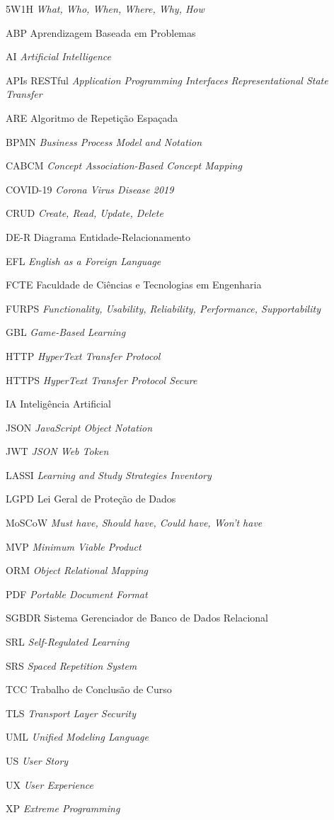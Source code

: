 \begin{siglas}
    \item[5W1H] \textit{What, Who, When, Where, Why, How}
    \item[ABP] Aprendizagem Baseada em Problemas
    \item[AI] \textit{Artificial Intelligence}
    \item[APIs RESTful] \textit{Application Programming Interfaces Representational State Transfer}
    \item[ARE] Algoritmo de Repetição Espaçada
    \item[BPMN] \textit{Business Process Model and Notation}
    \item[CABCM] \textit{Concept Association-Based Concept Mapping}
    \item[COVID-19] \textit{Corona Virus Disease 2019}
    \item[CRUD] \textit{Create, Read, Update, Delete}
    \item[DE-R] Diagrama Entidade-Relacionamento
    \item[EFL] \textit{English as a Foreign Language}
    \item[FCTE] Faculdade de Ciências e Tecnologias em Engenharia
    \item[FURPS] \textit{Functionality, Usability, Reliability, Performance, Supportability}
    \item[GBL] \textit{Game-Based Learning}
    \item[HTTP] \textit{HyperText Transfer Protocol}
    \item[HTTPS] \textit{HyperText Transfer Protocol Secure}
    \item[IA] Inteligência Artificial
    \item[JSON] \textit{JavaScript Object Notation}
    \item[JWT] \textit{JSON Web Token}
    \item[LASSI] \textit{Learning and Study Strategies Inventory}
    \item[LGPD] Lei Geral de Proteção de Dados
    \item[MoSCoW] \textit{Must have, Should have, Could have, Won't have}
    \item[MVP] \textit{Minimum Viable Product}
    \item[ORM] \textit{Object Relational Mapping}
    \item[PDF] \textit{Portable Document Format}
    \item[SGBDR] Sistema Gerenciador de Banco de Dados Relacional
    \item[SRL] \textit{Self-Regulated Learning}
    \item[SRS] \textit{Spaced Repetition System}
    \item[TCC] Trabalho de Conclusão de Curso
    \item[TLS] \textit{Transport Layer Security}
    \item[UML] \textit{Unified Modeling Language}
    \item[US] \textit{User Story}
    \item[UX] \textit{User Experience}
    \item[XP] \textit{Extreme Programming}
\end{siglas}
